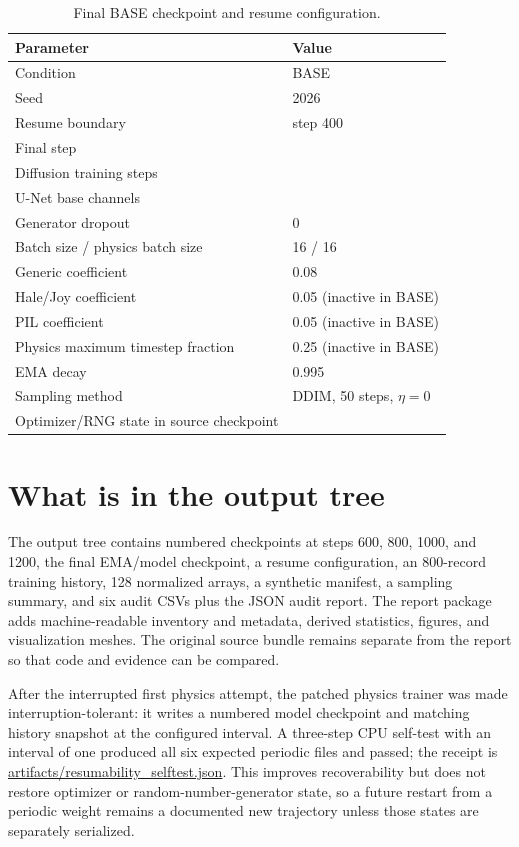 \documentclass[11pt,oneside]{report}
\begin{document}
\begin{table}[H]
\centering
\caption{Final BASE checkpoint and resume configuration.}
\label{tab:config}
\begin{tabular}{ll}
\toprule
Parameter & Value \\
\midrule
Condition & BASE \\
Seed & 2026 \\
Resume boundary & step 400 \\
Final step & \BaseSteps{} \\
Diffusion training steps & \DiffusionSteps{} \\
U-Net base channels & \BaseChannels{} \\
Generator dropout & 0 \\
Batch size / physics batch size & 16 / 16 \\
Generic coefficient & 0.08 \\
Hale/Joy coefficient & 0.05 (inactive in BASE) \\
PIL coefficient & 0.05 (inactive in BASE) \\
Physics maximum timestep fraction & 0.25 (inactive in BASE) \\
EMA decay & 0.995 \\
Sampling method & DDIM, 50 steps, $\eta=0$ \\
Optimizer/RNG state in source checkpoint & \CheckpointOptimizer{} \\
\bottomrule
\end{tabular}
\end{table}

\section{What is in the output tree}

The output tree contains numbered checkpoints at steps 600, 800, 1000, and 1200, the final EMA/model checkpoint, a resume configuration, an 800-record training history, 128 normalized arrays, a synthetic manifest, a sampling summary, and six audit CSVs plus the JSON audit report. The report package adds machine-readable inventory and metadata, derived statistics, figures, and visualization meshes. The original source bundle remains separate from the report so that code and evidence can be compared.

After the interrupted first physics attempt, the patched physics trainer was made interruption-tolerant: it writes a numbered model checkpoint and matching history snapshot at the configured interval. A three-step CPU self-test with an interval of one produced all six expected periodic files and passed; the receipt is \url{artifacts/resumability_selftest.json}. This improves recoverability but does not restore optimizer or random-number-generator state, so a future restart from a periodic weight remains a documented new trajectory unless those states are separately serialized.
\end{document}
